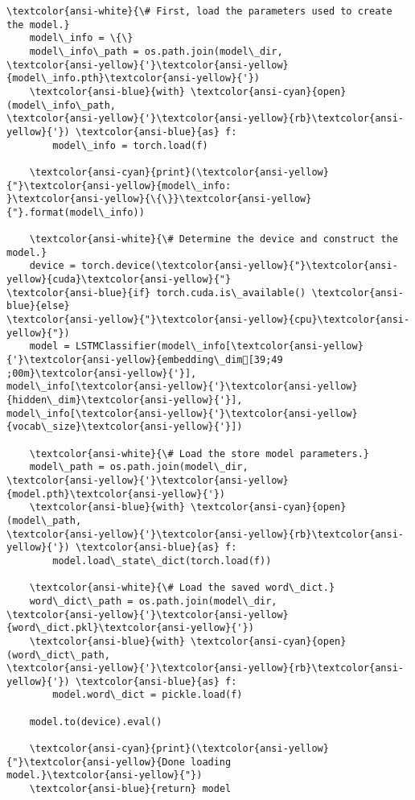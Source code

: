 \documentclass[11pt]{article}
\begin{document}
\begin{Verbatim}[commandchars=\\\{\}]
    \textcolor{ansi-white}{\# First, load the parameters used to create the model.}
    model\_info = \{\}
    model\_info\_path = os.path.join(model\_dir,
\textcolor{ansi-yellow}{'}\textcolor{ansi-yellow}{model\_info.pth}\textcolor{ansi-yellow}{'})
    \textcolor{ansi-blue}{with} \textcolor{ansi-cyan}{open}(model\_info\_path,
\textcolor{ansi-yellow}{'}\textcolor{ansi-yellow}{rb}\textcolor{ansi-yellow}{'}) \textcolor{ansi-blue}{as} f:
        model\_info = torch.load(f)

    \textcolor{ansi-cyan}{print}(\textcolor{ansi-yellow}{"}\textcolor{ansi-yellow}{model\_info:
}\textcolor{ansi-yellow}{\{\}}\textcolor{ansi-yellow}{"}.format(model\_info))

    \textcolor{ansi-white}{\# Determine the device and construct the model.}
    device = torch.device(\textcolor{ansi-yellow}{"}\textcolor{ansi-yellow}{cuda}\textcolor{ansi-yellow}{"}
\textcolor{ansi-blue}{if} torch.cuda.is\_available() \textcolor{ansi-blue}{else}
\textcolor{ansi-yellow}{"}\textcolor{ansi-yellow}{cpu}\textcolor{ansi-yellow}{"})
    model = LSTMClassifier(model\_info[\textcolor{ansi-yellow}{'}\textcolor{ansi-yellow}{embedding\_dim[39;49
;00m}\textcolor{ansi-yellow}{'}],
model\_info[\textcolor{ansi-yellow}{'}\textcolor{ansi-yellow}{hidden\_dim}\textcolor{ansi-yellow}{'}],
model\_info[\textcolor{ansi-yellow}{'}\textcolor{ansi-yellow}{vocab\_size}\textcolor{ansi-yellow}{'}])

    \textcolor{ansi-white}{\# Load the store model parameters.}
    model\_path = os.path.join(model\_dir,
\textcolor{ansi-yellow}{'}\textcolor{ansi-yellow}{model.pth}\textcolor{ansi-yellow}{'})
    \textcolor{ansi-blue}{with} \textcolor{ansi-cyan}{open}(model\_path,
\textcolor{ansi-yellow}{'}\textcolor{ansi-yellow}{rb}\textcolor{ansi-yellow}{'}) \textcolor{ansi-blue}{as} f:
        model.load\_state\_dict(torch.load(f))

    \textcolor{ansi-white}{\# Load the saved word\_dict.}
    word\_dict\_path = os.path.join(model\_dir,
\textcolor{ansi-yellow}{'}\textcolor{ansi-yellow}{word\_dict.pkl}\textcolor{ansi-yellow}{'})
    \textcolor{ansi-blue}{with} \textcolor{ansi-cyan}{open}(word\_dict\_path,
\textcolor{ansi-yellow}{'}\textcolor{ansi-yellow}{rb}\textcolor{ansi-yellow}{'}) \textcolor{ansi-blue}{as} f:
        model.word\_dict = pickle.load(f)

    model.to(device).eval()

    \textcolor{ansi-cyan}{print}(\textcolor{ansi-yellow}{"}\textcolor{ansi-yellow}{Done loading
model.}\textcolor{ansi-yellow}{"})
    \textcolor{ansi-blue}{return} model


\end{Verbatim}
\end{document}

